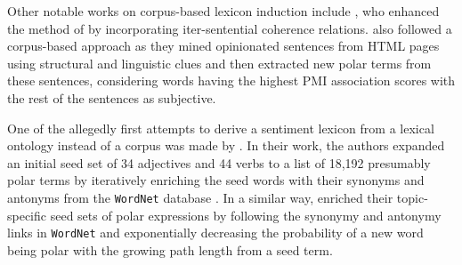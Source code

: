 Other notable works on corpus-based lexicon induction include
\citet{Kanayama:06}, who enhanced the method of
\citeauthor{Hatzivassi:97} by incorporating iter-sentential coherence
relations.  \citet{Kaji:07} also followed a corpus-based approach as
they mined opinionated sentences from HTML pages using structural and
linguistic clues and then extracted new polar terms from these
sentences, considering words having the highest PMI association scores
with the rest of the sentences as subjective.

One of the allegedly first attempts to derive a sentiment lexicon from
a lexical ontology instead of a corpus was made by \citet{Kim:04}.  In
their work, the authors expanded an initial seed set of 34 adjectives
and 44 verbs to a list of 18,192 presumably polar terms by iteratively
enriching the seed words with their synonyms and antonyms from the
\texttt{WordNet} database \citep{Miller:95}. In a similar way,
\citet{Godbole:07} enriched their topic-specific seed sets of polar
expressions by following the synonymy and antonymy links in
\texttt{WordNet} and exponentially decreasing the probability of a new
word being polar with the growing path length from a seed term.




